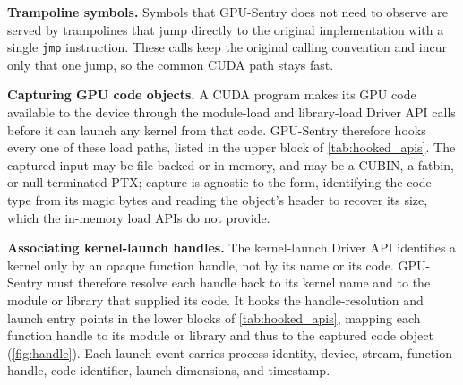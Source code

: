 \textbf{Trampoline symbols.}
Symbols that GPU-Sentry does not need to observe are served by trampolines that jump directly to the original implementation with a single \texttt{jmp} instruction. These calls keep the original calling convention and incur only that one jump, so the common CUDA path stays fast.

\textbf{Capturing GPU code objects.}
A CUDA program makes its GPU code available to the device through the module-load and library-load Driver API calls before it can launch any kernel from that code. GPU-Sentry therefore hooks every one of these load paths, listed in the upper block of \cref{tab:hooked_apis}. The captured input may be file-backed or in-memory, and may be a CUBIN, a fatbin, or null-terminated PTX; capture is agnostic to the form, identifying the code type from its magic bytes and reading the object's header to recover its size, which the in-memory load APIs do not provide.

\textbf{Associating kernel-launch handles.}
The kernel-launch Driver API identifies a kernel only by an opaque function handle, not by its name or its code. GPU-Sentry must therefore resolve each handle back to its kernel name and to the module or library that supplied its code. It hooks the handle-resolution and launch entry points in the lower blocks of \cref{tab:hooked_apis}, mapping each function handle to its module or library and thus to the captured code object (\cref{fig:handle}). Each launch event carries process identity, device, stream, function handle, code identifier, launch dimensions, and timestamp.

